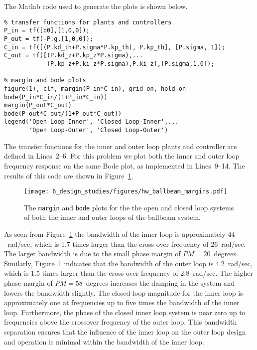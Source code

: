 The Matlab code used to generate the plots is shown below.
\begin{lstlisting}
% transfer functions for plants and controllers
P_in = tf([b0],[1,0,0]);
P_out = tf(-P.g,[1,0,0]);
C_in = tf([(P.kd_th+P.sigma*P.kp_th), P.kp_th], [P.sigma, 1]);
C_out = tf([(P.kd_z+P.kp_z*P.sigma),...
            (P.kp_z+P.ki_z*P.sigma),P.ki_z],[P.sigma,1,0]);

% margin and bode plots 
figure(1), clf, margin(P_in*C_in), grid on, hold on
bode(P_in*C_in/(1+P_in*C_in)) 
margin(P_out*C_out)
bode(P_out*C_out/(1+P_out*C_out))
legend('Open Loop-Inner', 'Closed Loop-Inner',...
       'Open Loop-Outer', 'Closed Loop-Outer')
\end{lstlisting}

The transfer functions for the inner and outer loop plants and controller are defined in Lines~2--6.  For this problem we plot both the inner and outer loop frequency response on the same Bode plot, as implemented in Lines~9--14. The results of this code are shown in Figure~\ref{fig:hw_ballbeam_margins}.
\begin{figure}[H]
   \centering
   \texttt{[image: 6\_design\_studies/figures/hw\_ballbeam\_margins.pdf]}
   \caption{The {\tt margin} and {\tt bode} plots for the the open and closed loop systems of both the inner and outer loops of the ballbeam system.}
   \label{fig:hw_ballbeam_margins}
\end{figure} 
As seen from Figure~\ref{fig:hw_ballbeam_margins} the bandwidth of the inner loop is approximately $44$~rad/sec, which is 1.7 times larger than the cross over frequency of $26$~rad/sec.  The larger bandwidth is due to the small phase margin of $PM=20$~degrees.
%
Similarly, Figure~\ref{fig:hw_ballbeam_margins} indicates that the bandwidth of the outer loop is $4.2$~rad/sec, which is 1.5 times larger than the cross over frequency of $2.8$~rad/sec.  The higher phase margin of $PM=58$~degrees increases the damping in the system and lowers the bandwidth slightly.
%
The closed-loop magnitude for the inner loop is approximately one at frequencies up to five times the bandwidth of the inner loop. Furthermore, the phase of the closed inner loop system is near zero up to frequencies above the crossover frequency of the outer loop. This bandwidth separation ensures that the influence of the inner loop on the outer loop design and operation is minimal within the bandwidth of the inner loop.